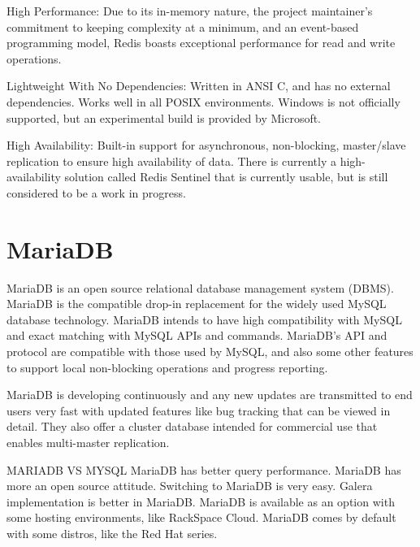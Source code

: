 High Performance:  Due to its in-memory nature, the project maintainer’s commitment to keeping complexity at a minimum, and an event-based programming model, Redis boasts exceptional performance for read and write operations.\newline

Lightweight With No Dependencies:  Written in ANSI C, and has no external dependencies. Works well in all POSIX environments. Windows is not officially supported, but an experimental build is provided by Microsoft.\newline

High Availability:  Built-in support for asynchronous, non-blocking, master/slave replication to ensure high availability of data. There is currently a high-availability solution called Redis Sentinel that is currently usable, but is still considered to be a work in progress.\newline

\section {MariaDB}
MariaDB is an open source relational database management system (DBMS). MariaDB is the compatible drop-in replacement for the widely used MySQL database technology. MariaDB intends to have high compatibility with MySQL and exact matching with MySQL APIs and commands. MariaDB's API and protocol are compatible with those used by MySQL, and also some other features to support local non-blocking operations and progress reporting.\newline

MariaDB is developing continuously and any new updates are transmitted to end users very fast with updated features like bug tracking that can be viewed in detail. They also offer a cluster database intended for commercial use that enables multi-master replication.\newline

MARIADB VS MYSQL\newline
MariaDB has better query performance.\newline
MariaDB has more an open source attitude.\newline
Switching to MariaDB is very easy.\newline
Galera implementation is better in MariaDB.\newline
MariaDB is available as an option with some hosting environments, like RackSpace Cloud.\newline
MariaDB comes by default with some distros, like the Red Hat series.\newline

